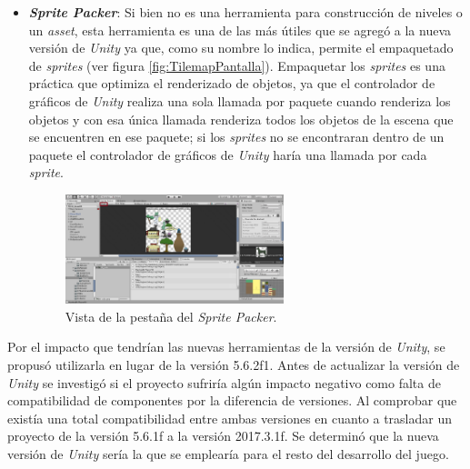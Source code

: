 \begin{itemize}
		\item \textbf{\textit{Sprite Packer}}: Si bien no es una herramienta para 
		construcción de niveles o un \textit{asset}, esta herramienta es una de las 
		más útiles que se agregó a la nueva versión de \textit{Unity} ya que, como 
		su nombre lo indica, permite el empaquetado de \textit{sprites} (ver figura 
		\ref{fig:TilemapPantalla}). Empaquetar 
		los \textit{sprites} es una práctica que optimiza el renderizado de objetos, 
		ya que el controlador de gráficos de \textit{Unity} realiza una sola llamada 
		por paquete cuando renderiza los objetos y con esa única llamada renderiza todos 
		los objetos de la escena que se encuentren en ese paquete; si los 
		\textit{sprites} no se encontraran dentro de un paquete el controlador de 
		gráficos de \textit{Unity} haría una llamada por cada \textit{sprite}.  
			\begin{figure}[h]
    			\centering
    			\includegraphics[width=0.6\textwidth]{02Antecedentes/Imagenes/01.png}
    			\caption{Vista de la pestaña del \textit{Sprite Packer}.}
    			\label{fig:CinemaPantalla}
			\end{figure}
	\end{itemize}
	Por el impacto que tendrían las nuevas herramientas de la versión de 
	\textit{Unity}, se propusó utilizarla en lugar de la versión 5.6.2f1. Antes 
	de actualizar la versión de \textit{Unity} se investigó si el proyecto sufriría 
	algún impacto negativo como falta de compatibilidad de componentes por la 
	diferencia de versiones. Al comprobar que existía una total compatibilidad 
	entre ambas versiones en cuanto a trasladar un proyecto de la versión 5.6.1f 
	a la versión 2017.3.1f. Se determinó que la nueva versión de \textit{Unity} 
	sería la que se emplearía para el resto del desarrollo del juego.
	

